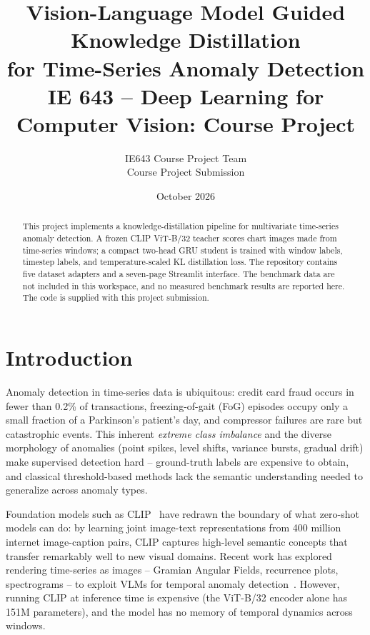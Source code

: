 \documentclass[10pt,twocolumn]{article}
\title{
    \vspace{-1em}
    \textbf{Vision-Language Model Guided Knowledge Distillation\\
    for Time-Series Anomaly Detection}\\
    \large IE 643 -- Deep Learning for Computer Vision: Course Project
}
\author{
    IE643 Course Project Team \\
    Course Project Submission
}
\date{October 2026}
\begin{document}
\maketitle
\thispagestyle{fancy}

\begin{abstract}
This project implements a knowledge-distillation pipeline for multivariate time-series anomaly detection. A frozen CLIP ViT-B/32 teacher scores chart images made from time-series windows; a compact two-head GRU student is trained with window labels, timestep labels, and temperature-scaled KL distillation loss. The repository contains five dataset adapters and a seven-page Streamlit interface. The benchmark data are not included in this workspace, and no measured benchmark results are reported here. The code is supplied with this project submission.
\end{abstract}

\section{Introduction}

Anomaly detection in time-series data is ubiquitous: credit card fraud occurs in fewer than 0.2\% of transactions, freezing-of-gait (FoG) episodes occupy only a small fraction of a Parkinson's patient's day, and compressor failures are rare but catastrophic events. This inherent \emph{extreme class imbalance} and the diverse morphology of anomalies (point spikes, level shifts, variance bursts, gradual drift) make supervised detection hard -- ground-truth labels are expensive to obtain, and classical threshold-based methods lack the semantic understanding needed to generalize across anomaly types.

Foundation models such as CLIP~\cite{clip2021} have redrawn the boundary of what zero-shot models can do: by learning joint image-text representations from 400 million internet image-caption pairs, CLIP captures high-level semantic concepts that transfer remarkably well to new visual domains. Recent work has explored rendering time-series as images -- Gramian Angular Fields, recurrence plots, spectrograms -- to exploit VLMs for temporal anomaly detection~\cite{sun2024timeseriesclipanom, jin2024timellm}. However, running CLIP at inference time is expensive (the ViT-B/32 encoder alone has 151M parameters), and the model has no memory of temporal dynamics across windows.
\end{document}
